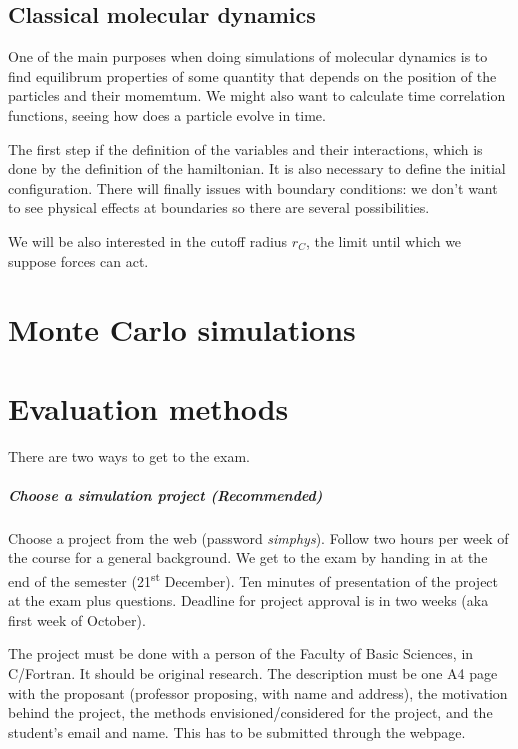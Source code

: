 \documentclass[palatino]{epflnotes}
\begin{document}
\section{Classical molecular dynamics}

One of the main purposes when doing simulations of molecular dynamics is to find equilibrum properties of some quantity that depends on the position of the particles and their momemtum. We might also want to calculate time correlation functions, seeing how does a particle evolve in time.

The first step if the definition of the variables and their interactions, which is done by the definition of the hamiltonian. It is also necessary to define the initial configuration. There will finally issues with boundary conditions: we don't want to see physical effects at boundaries so there are several possibilities.

We will be also interested in the cutoff radius $r_C$, the limit until which we suppose forces can act.

\chapter{Monte Carlo simulations}

\appendix

\chapter{Evaluation methods}

There are two ways to get to the exam.

\paragraph{Choose a simulation project (Recommended)} Choose a project from the web (password \textit{simphys}). Follow two hours per week of the course for a general background. We get to the exam by handing in at the end of the semester (21\textsuperscript{st} December). Ten minutes of presentation of the project at the exam plus questions. Deadline for project approval is in two weeks (aka first week of October).

The project must be done with a person of the Faculty of Basic Sciences, in C/Fortran. It should be original research. The description must be one A4 page with the proposant (professor proposing, with name and address), the motivation behind the project, the methods envisioned/considered for the project, and the student's email and name. This has to be submitted through the webpage.
\end{document}
